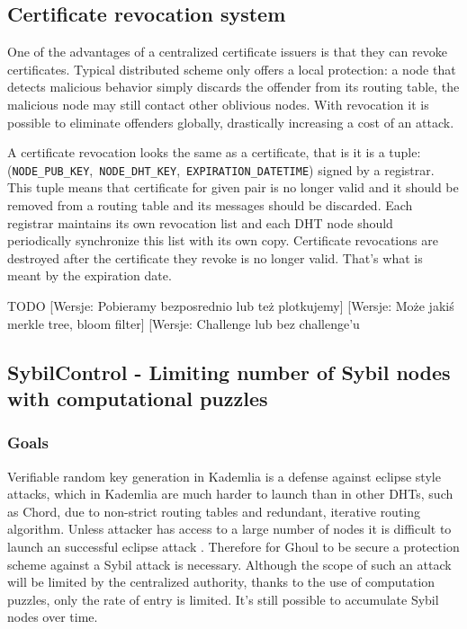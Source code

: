 \subsection{Certificate revocation system}

One of the advantages of a centralized certificate issuers is that they can
revoke certificates. Typical distributed scheme only offers a local protection:
a node that detects malicious behavior simply discards the offender from its
routing table, the malicious node may still contact other oblivious nodes. With
revocation it is possible to eliminate offenders globally, drastically
increasing a cost of an attack.

A certificate revocation looks the same as a certificate, that is it is a
tuple:\\
(\texttt{NODE\_PUB\_KEY},~\texttt{NODE\_DHT\_KEY},~\texttt{EXPIRATION\_DATETIME})
signed by a registrar. This tuple means that certificate for given pair is no
longer valid and it should be removed from a routing table and its messages
should be discarded. Each registrar maintains its own revocation list and each
DHT node should periodically synchronize this list with its own copy.
Certificate revocations are destroyed after the certificate they revoke is no
longer valid. That's what is meant by the expiration date.

TODO
[Wersje: Pobieramy bezposrednio lub też plotkujemy]
[Wersje: Może jakiś merkle tree, bloom filter]
[Wersje: Challenge lub bez challenge'u

\subsection{SybilControl - Limiting number of Sybil nodes with computational
puzzles}
\subsubsection{Goals}
  Verifiable random key generation in Kademlia is a defense against eclipse
  style attacks, which in Kademlia are much harder to launch than in other
  DHTs, such as Chord, due to non-strict routing tables and redundant, iterative
  routing algorithm. Unless attacker has access to a large number of nodes it is
  difficult to launch an successful eclipse attack \cite{mac09}. Therefore for
  Ghoul to be secure a protection scheme against a Sybil attack is necessary.
  Although the scope of such an attack will be limited by the centralized
  authority, thanks to the use of computation puzzles, only the rate of
  entry is limited. It's still possible to accumulate Sybil nodes over time.

